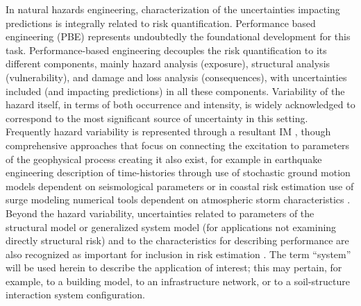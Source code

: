 In natural hazards engineering, characterization of the uncertainties impacting predictions is integrally related to risk quantification. Performance based engineering (PBE) \citep{whittaker2003performancebased, goulet2007evaluation, riggs2008experimental, ciampoli2011performancebased, barbato2013performancebased, fischer2019performancebased} represents undoubtedly the foundational development for this task. Performance-based engineering decouples the risk quantification to its different components, mainly hazard analysis (exposure), structural analysis (vulnerability), and damage and loss analysis (consequences), with uncertainties included (and impacting predictions) in all these components. Variability of the hazard itself, in terms of both occurrence and intensity, is widely acknowledged to correspond to the most significant source of uncertainty in this setting. Frequently hazard variability is represented through a resultant IM \citep{baker2005vectorvalued,kohrangi2016implications}, though comprehensive approaches that focus on connecting the excitation to parameters of the geophysical process creating it also exist, for example in earthquake engineering description of time-histories through use of stochastic ground motion models dependent on seismological parameters \citep{bijelic2018validation, vlachos2018predictive} or in coastal risk estimation use of surge modeling numerical tools dependent on atmospheric storm characteristics \citep{resio2007white}. Beyond the hazard variability, uncertainties related to parameters of the structural model or generalized system model (for applications not examining directly structural risk) and to the characteristics for describing performance are also recognized as important for inclusion in risk estimation \citep{porter2002sensitivity}. The term ``system'' will be used herein to describe the application of interest; this may pertain, for example, to a building model, to an infrastructure network, or to a soil-structure interaction system configuration. 

